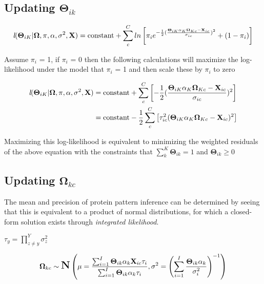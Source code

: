 \subsection*{Updating $\mathbf{\Theta}_{ik}$}

\begin{align}
\textit{l}(\mathbf{\Theta}_{iK} | \mathbf{\Omega}, \pi, \alpha, \sigma^{2}, \textbf{X}) &= \text{constant} + \sum_{c}^{C}ln\left[\pi_{i}e^{-\frac{1}{2}(\frac{\mathbf{\Theta}_{iK}\alpha_{K}\mathbf{\Omega}_{Kc} - \textbf{X}_{ic}}{\sigma_{ic}})^2} + (1-\pi_{i})\right]\notag\\
\end{align}

Assume $\pi_{i}$ = 1, if $\pi_{i}$ = 0 then the following calculations will maximize the log-likelihood under the model that $\pi_{i}$ = 1 and then scale these by $\pi_{i}$ to zero

\begin{align}
\textit{l}(\mathbf{\Theta}_{iK} | \mathbf{\Omega}, \pi, \alpha, \sigma^{2}, \textbf{X}) &= \text{constant} + \sum_{c}^{C}\left[{-\frac{1}{2}(\frac{\mathbf{\Theta}_{iK}\alpha_{K}\mathbf{\Omega}_{Kc} - \textbf{X}_{ic}}{\sigma_{ic}})^2}\right]\notag\\
 &= \text{constant} -\frac{1}{2}\sum_{c}^{C}\left[{\tau_{ic}^{2}(\mathbf{\Theta}_{iK}\alpha_{K}\mathbf{\Omega}_{Kc} - \textbf{X}_{ic})^2}\right]\notag\\
\end{align}

Maximizing this log-likelihood is equivalent to minimizing the weighted residuals of the above equation with the constraints that $\sum_{k}^{K}\mathbf{\Theta}_{ik} = 1$ and $\mathbf{\Theta}_{ik} \ge 0$
\subsection*{Updating $\mathbf{\Omega}_{kc}$}

The mean and precision of protein pattern inference can be determined by seeing that this is equivalent to a product of normal distributions, for which a closed-form solution exists through \textit{integrated likelihood}.

$\tau_{y} = \prod_{z \neq y}^{Y}\sigma^{2}_{z}$

\begin{align}
\mathbf{\Omega}_{kc} \sim \mbox{\Large \textbf{N}}\left(\mu = \frac{\sum_{i = 1}^{I}\mathbf{\Theta}_{ik}\alpha_{k}\textbf{X}_{ic}\tau_{i}}{\sum_{i = 1}^{I}\mathbf{\Theta}_{ik}\alpha_{k}\tau_{i}}, \sigma^{2} =  \left(\sum_{i = 1}^{I}\frac{\mathbf{\Theta}_{ik}\alpha_{k}}{\sigma^{2}_{i}}\right)^{-1} \right)
\end{align}

